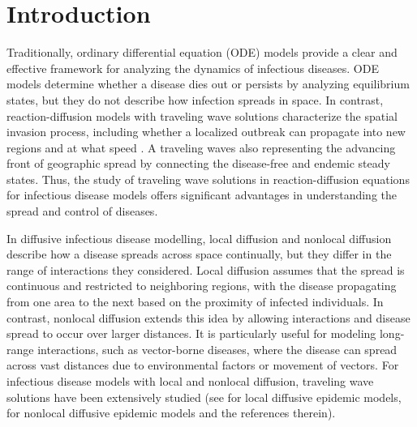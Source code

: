 \documentclass[final,3p,times]{elsarticle}
\numberwithin{equation}{section}
\def\d {{\rm d}}
\begin{document}


\section{Introduction}
\def\d {{\rm d}}
Traditionally, ordinary differential equation (ODE) models provide a clear and effective framework for analyzing the dynamics of infectious diseases. ODE models determine whether a disease dies out or persists by analyzing equilibrium states, but they do not describe how infection spreads in space. In contrast, reaction-diffusion models with traveling wave solutions characterize the spatial invasion process, including whether a localized outbreak can propagate into new regions and at what speed \cite{DiekmannJMB1978}. A traveling waves also representing the advancing front of geographic spread by connecting the disease-free and endemic steady states. Thus, the study of traveling wave solutions in reaction-diffusion equations for infectious disease models offers significant advantages in understanding the spread and control of diseases. 

In diffusive infectious disease modelling, local diffusion and nonlocal diffusion describe how a disease spreads across space continually, but they differ in the range of interactions they considered. Local diffusion assumes that the spread is continuous and restricted to neighboring regions, with the disease propagating from one area to the next based on the proximity of infected individuals. In contrast, nonlocal diffusion extends this idea by allowing interactions and disease spread to occur over larger distances. It is particularly useful for modeling long-range interactions, such as vector-borne diseases, where the disease can spread across vast distances due to environmental factors or movement of vectors. For infectious disease models with local and nonlocal diffusion, traveling wave solutions have been extensively studied (see \cite{ZhaoWangRuanJMB2018,WangZhaoWangZhangJDDE2023,ZhaoLiuNARWA2026} for local diffusive epidemic models, \cite{LiLiYangAMC2014,LiLinMaYangDCDSB2014,HeZhangMMAS2025} for nonlocal diffusive epidemic models and the references therein). 
\end{document}
